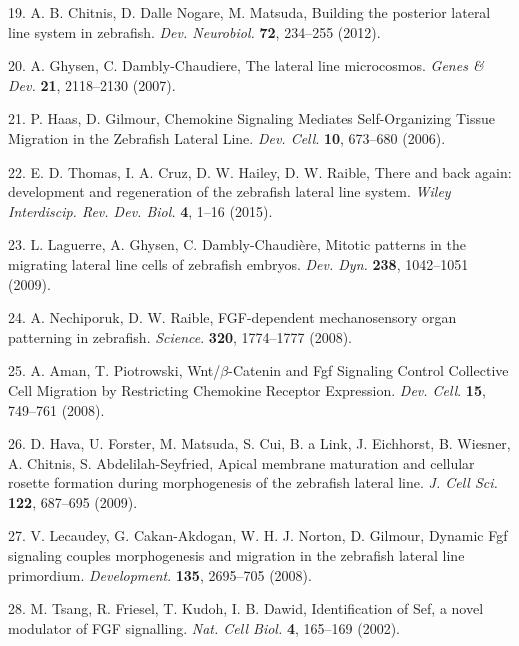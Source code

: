 \documentclass[11pt,singlespacinge,twoside]{reedthesis} %
\begin{document}
\leavevmode\hypertarget{ref-Chitnis2012a}{}%
19. A. B. Chitnis, D. Dalle Nogare, M. Matsuda, Building the posterior lateral line system in zebrafish. \emph{Dev. Neurobiol.} \textbf{72}, 234--255 (2012).

\leavevmode\hypertarget{ref-Ghysen2007a}{}%
20. A. Ghysen, C. Dambly-Chaudiere, The lateral line microcosmos. \emph{Genes \& Dev.} \textbf{21}, 2118--2130 (2007).

\leavevmode\hypertarget{ref-Haas2006c}{}%
21. P. Haas, D. Gilmour, Chemokine Signaling Mediates Self-Organizing Tissue Migration in the Zebrafish Lateral Line. \emph{Dev. Cell}. \textbf{10}, 673--680 (2006).

\leavevmode\hypertarget{ref-Harding2014a}{}%
22. E. D. Thomas, I. A. Cruz, D. W. Hailey, D. W. Raible, There and back again: development and regeneration of the zebrafish lateral line system. \emph{Wiley Interdiscip. Rev. Dev. Biol.} \textbf{4}, 1--16 (2015).

\leavevmode\hypertarget{ref-Laguerre2009a}{}%
23. L. Laguerre, A. Ghysen, C. Dambly-Chaudière, Mitotic patterns in the migrating lateral line cells of zebrafish embryos. \emph{Dev. Dyn.} \textbf{238}, 1042--1051 (2009).

\leavevmode\hypertarget{ref-Nechiporuk2008}{}%
24. A. Nechiporuk, D. W. Raible, FGF-dependent mechanosensory organ patterning in zebrafish. \emph{Science}. \textbf{320}, 1774--1777 (2008).

\leavevmode\hypertarget{ref-Aman2008}{}%
25. A. Aman, T. Piotrowski, Wnt/\(\beta\)-Catenin and Fgf Signaling Control Collective Cell Migration by Restricting Chemokine Receptor Expression. \emph{Dev. Cell}. \textbf{15}, 749--761 (2008).

\leavevmode\hypertarget{ref-Hava2009}{}%
26. D. Hava, U. Forster, M. Matsuda, S. Cui, B. a Link, J. Eichhorst, B. Wiesner, A. Chitnis, S. Abdelilah-Seyfried, Apical membrane maturation and cellular rosette formation during morphogenesis of the zebrafish lateral line. \emph{J. Cell Sci.} \textbf{122}, 687--695 (2009).

\leavevmode\hypertarget{ref-Lecaudey2008a}{}%
27. V. Lecaudey, G. Cakan-Akdogan, W. H. J. Norton, D. Gilmour, Dynamic Fgf signaling couples morphogenesis and migration in the zebrafish lateral line primordium. \emph{Development}. \textbf{135}, 2695--705 (2008).

\leavevmode\hypertarget{ref-Tsang}{}%
28. M. Tsang, R. Friesel, T. Kudoh, I. B. Dawid, Identification of Sef, a novel modulator of FGF signalling. \emph{Nat. Cell Biol.} \textbf{4}, 165--169 (2002).
\end{document}
